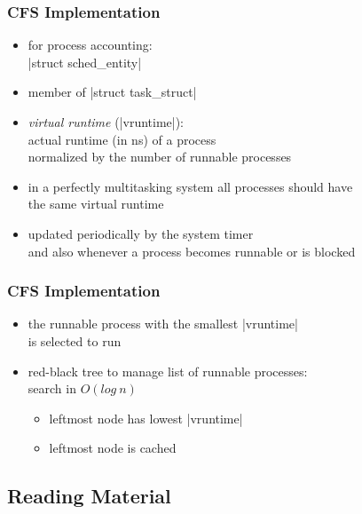 \documentclass[dvipsnames]{beamer}
\begin{document}
\begin{frame}
  \frametitle{CFS Implementation}

   \begin{itemize}
    \item for process accounting:\\
      |struct sched_entity|
    \item member of |struct task_struct|

    \medskip
    \item \emph{virtual runtime} (|vruntime|):\\
      actual runtime (in ns) of a process\\
      normalized by the number of runnable processes
    \item in a perfectly multitasking system all processes should have\\
      the same virtual runtime
    \item updated periodically by the system timer\\
      and also whenever a process becomes runnable or is blocked
   \end{itemize}
\end{frame}

\begin{frame}
  \frametitle{CFS Implementation}

  \begin{itemize}
    \item the runnable process with the smallest |vruntime|\\
      is selected to run
    \item red-black tree to manage list of runnable processes:\\
      search in $O(log~n)$
    \begin{itemize}
      \item leftmost node has lowest |vruntime|
      \item leftmost node is cached
    \end{itemize}
  \end{itemize}
\end{frame}

\subsection*{Reading Material}
\end{document}
